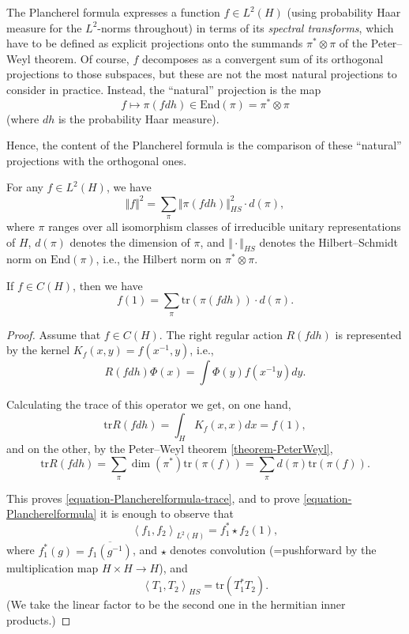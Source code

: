 The Plancherel formula expresses a function $f\in L^2(H)$ (using probability Haar measure for the $L^2$-norms throughout) in terms of its \emph{spectral transforms}, which have to be defined as explicit projections onto the summands $\pi^*\otimes \pi$ of the Peter--Weyl theorem. Of course, $f$ decomposes as a convergent sum of its orthogonal projections to those subspaces, but these are not the most natural projections to consider in practice. Instead, the ``natural'' projection is the map
$$ f\mapsto \pi(f dh) \in \text{End}(\pi) = \pi^*\otimes \pi$$
(where $dh$ is the probability Haar measure). 

Hence, the content of the Plancherel formula is the comparison of these ``natural'' projections with the orthogonal ones.

\begin{theorem}
 \label{theorem-Plancherel}
For any $f\in L^2(H)$, we have 
\begin{equation}
 \label{equation-Plancherelformula}
\Vert f\Vert^2 = \sum_\pi \Vert \pi(fdh) \Vert_{HS}^2 \cdot d(\pi),
\end{equation}
 where $\pi$ ranges over all isomorphism classes of irreducible unitary representations of $H$, $d(\pi)$ denotes the dimension of $\pi$, and $\Vert \cdot \Vert_{HS}$ denotes the Hilbert--Schmidt norm on $\text{End}(\pi)$, i.e., the Hilbert norm on $\pi^*\otimes \pi$.
 
 If $f\in C(H)$, then we have 
\begin{equation}
 \label{equation-Plancherelformula-trace}
f(1) = \sum_\pi \text{tr}\left( \pi(fdh) \right) \cdot d(\pi).
\end{equation}
\end{theorem}

\begin{proof}
 Assume that $f \in C(H)$. The right regular action $R(fdh)$ is represented by the kernel $K_f(x,y) = f(x^{-1},y)$, i.e., 
 $$ R(fdh)\Phi(x) = \int \Phi(y) f(x^{-1}y) dy.$$
 
 Calculating the trace of this operator we get, on one hand, 
 $$ \text{tr} R(fdh) = \int_{H} K_f(x,x) dx = f(1),$$
 and on the other, by the Peter--Weyl theorem \ref{theorem-PeterWeyl}, 
 $$ \text{tr} R(fdh) = \sum_\pi \dim(\pi^*) \text{tr}(\pi(f)) = \sum_\pi d(\pi) \text{tr}(\pi(f)).$$
 
 This proves \eqref{equation-Plancherelformula-trace}, and to prove \eqref{equation-Plancherelformula} it is enough to observe that 
 $$ \left< f_1, f_2 \right>_{L^2(H)} = f_1^* \star f_2 (1),$$
 where $f_1^*(g) = \overline{f_1 (g^{-1})}$, and $\star$ denotes convolution (=pushforward by the multiplication map $H\times H\to H$), and 
 $$ \left< T_1, T_2\right>_{HS} = \text{tr} (T_1^* T_2).$$
 (We take the linear factor to be the second one in the hermitian inner products.)
\end{proof}


